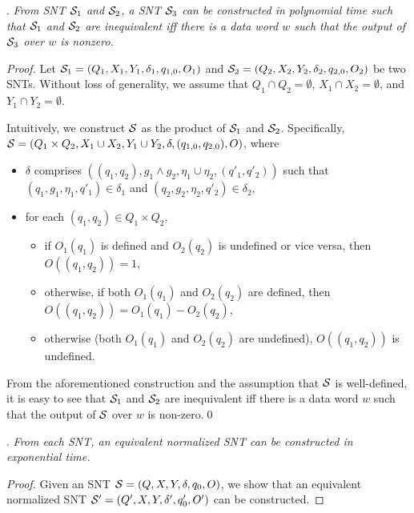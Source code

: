 \begin{appendix}
.
\emph{From SNT ${\mathcal{S} }_1$ and ${\mathcal{S} }_2$, a SNT ${\mathcal{S} }_3$ can be constructed in polynomial time such that ${\mathcal{S} }_1$ and ${\mathcal{S} }_2$ are  inequivalent iff there is a data word $w$ such that the output of ${\mathcal{S} }_3$ over $w$ is nonzero.}

\begin{proof}
Let ${\mathcal{S} }_1 = (Q_1,X_1,Y_1,\delta_1,q_{1,0}, O_1)$ and  ${\mathcal{S} }_2 = (Q_2,X_2,Y_2,\delta_2,q_{2,0}, O_2)$ be two SNTs. Without loss of generality, we assume that $Q_1 \cap Q_2 = \emptyset$, $X_1 \cap X_2 = \emptyset$, and $Y_1 \cap Y_2 = \emptyset$. 

Intuitively, we construct ${\mathcal{S} }$ as the product of ${\mathcal{S} }_1$ and ${\mathcal{S} }_2$. Specifically, ${\mathcal{S} }=(Q_1 \times Q_2, X_1 \cup X_2, Y_1 \cup Y_2, \delta, (q_{1,0},q_{2,0}), O)$, where
\begin{itemize}
\item $\delta$ comprises $((q_1,q_2), g_1 \wedge g_2, \eta_1 \cup \eta_2, (q'_1,q'_2))$ such that $(q_1,g_1,\eta_1,q'_1) \in \delta_1$ and $(q_2,g_2,\eta_2,q'_2) \in \delta_2$,
%
\item for each $(q_1,q_2) \in Q_1 \times Q_2$, 
\begin{itemize}
\item if $O_1(q_1)$ is defined and $O_2(q_2)$ is undefined or vice versa, then $O((q_1,q_2))=1$, 
%
\item otherwise, if both $O_1(q_1)$ and $O_2(q_2)$ are defined, then $O((q_1,q_2))=O_1(q_1) - O_2(q_2)$, 
%
\item otherwise (both $O_1(q_1)$ and $O_2(q_2)$ are undefined), $O((q_1,q_2))$ is undefined. 
\end{itemize}
\end{itemize}
From the aforementioned construction and the assumption that ${\mathcal{S} }$ is well-defined, it is easy to see that ${\mathcal{S} }_1$ and ${\mathcal{S} }_2$ are  inequivalent iff there is a data word $w$ such that the output of ${\mathcal{S} }$ over $w$ is non-zero.\qed
\end{proof}


\vspace{4mm}

.
{\it From each SNT, an equivalent normalized SNT can be constructed in exponential time.} 


\newcommand{\tog}[1]{\mathsf{toGuard(#1)}}
\newcommand{\toec}[1]{\mathsf{toEqClass(#1)}}
\begin{proof}
Given an SNT ${\mathcal{S} }=(Q, X, Y, \delta, q_0, O)$, we show that an equivalent normalized SNT ${{\mathcal{S} }}'=(Q', X, Y, \delta', q'_0, O')$  can be constructed.


\end{proof}
\end{appendix}
